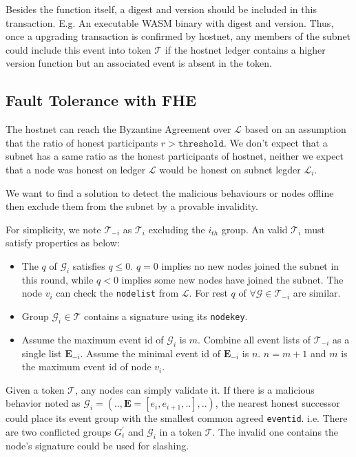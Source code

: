 \documentclass[11pt]{article}
\begin{document}
Besides the function itself, a digest and version should be included in this transaction. E.g. An executable WASM binary with digest and version.
Thus, once a upgrading transaction is confirmed by hostnet, any members of the subnet could include this event into token $\mathcal{T}$ if the hostnet ledger contains a higher version function but an associated event is absent in the token.

\subsection{Fault Tolerance with FHE}
The hostnet can reach the Byzantine Agreement over $\mathcal{L}$ based on an assumption that the ratio of honest participants $r > \texttt{threshold}$.
We don{'}t expect that a subnet has a same ratio as the honest participants of hostnet, neither we expect that a node was honest on ledger $\mathcal{L}$ would be honest on subnet legder $\mathcal{L}_{i}$.

We want to find a solution to detect the malicious behaviours or nodes offline then exclude them from the subnet by a provable invalidity.

For simplicity, we note $\mathcal{T}_{-i}$ as $\mathcal{T}_{i}$ excluding the $i_{th}$ group. An valid $\mathcal{T}_{i}$ must satisfy properties as below:

\begin{itemize}
\item The $q$ of $\mathcal{G}_{i}$ satisfies \(q \leq 0\). $q=0$ implies no new nodes joined the subnet in this round, while $q < 0$ implies some new nodes have joined the subnet. The node $v_{i}$ can check the \texttt{nodelist} from $\mathcal{L}$.
For rest $q$ of $\forall \mathcal{G} \in \mathcal{T}_{-i}$ are similar.
\item Group $\mathcal{G}_{i} \in \mathcal{T}$ contains a signature using its \texttt{nodekey}.
\item Assume the maximum event id of $\mathcal{G}_{i}$ is $m$. Combine all event lists of $\mathcal{T}_{-i}$ as a single list $\mathbf{E}_{-i}$. Assume the minimal event id of $\mathbf{E}_{-i}$ is $n$.
\(n = m+1\) and $m$ is the maximum event id of node $v_{i}$.
\end{itemize}

Given a token $\mathcal{T}$, any nodes can simply validate it.
If there is a malicious behavior noted as \( \mathcal{G}_{i} = (.., \mathbf{E} = [e_{i}, e_{i+1}, ..], ..) \), the nearest honest successor could place its event group with the smallest common agreed \texttt{eventid}.
i.e. There are two conflicted groups $G_{i}^{\prime}$ and $\mathcal{G}_{i}$ in a token $\mathcal{T}$. The invalid one contains the node's signature could be used for slashing.
\end{document}
